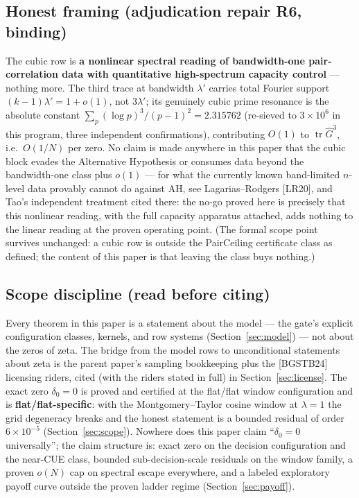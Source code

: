 \documentclass[11pt]{article}
\theoremstyle{plain}
\theoremstyle{definition}
\theoremstyle{remark}
\newcommand{\Gh}{\widehat{G}}
\newcommand{\tr}{\operatorname{tr}}
\begin{document}
\subsection{Honest framing (adjudication repair R6, binding)}

The cubic row is \textbf{a nonlinear spectral reading of bandwidth-one
pair-correlation data with quantitative high-spectrum capacity control} ---
nothing more. The third trace at bandwidth $\lambda'$ carries total Fourier
support $(k - 1)\lambda' = 1 + o(1)$, not $3\lambda'$; its genuinely cubic prime
resonance is the absolute constant
$\sum_p (\log p)^3/(p - 1)^2 = 2.315762$ (re-sieved to $3 \times 10^6$ in this
program, three independent confirmations), contributing $O(1)$ to $\tr \Gh^3$,
i.e.\ $O(1/N)$ per zero. No claim is made anywhere in this paper that the cubic
block evades the Alternative Hypothesis or consumes data beyond the bandwidth-one
class plus $o(1)$ --- for what the currently known band-limited $n$-level data
provably cannot do against AH, see Lagarias--Rodgers [LR20], and Tao's
independent treatment cited there: the no-go proved here is precisely that this
nonlinear reading, with the full capacity apparatus attached, adds nothing to
the linear reading at the proven operating point. (The formal scope point survives
unchanged: a cubic row is outside the PairCeiling certificate class as defined;
the content of this paper is that leaving the class buys nothing.)

\subsection{Scope discipline (read before citing)}

Every theorem in this paper is a statement about the model --- the gate's
explicit configuration classes, kernels, and row systems
(Section~\ref{sec:model}) --- not about the zeros of zeta. The bridge from the
model rows to unconditional statements about zeta is the parent paper's sampling
bookkeeping plus the [BGSTB24] licensing riders, cited (with the riders stated in
full) in Section~\ref{sec:license}. The exact zero $\delta_0 = 0$ is proved and
certified at the flat/flat window configuration and is
\textbf{flat/flat-specific}: with the Montgomery--Taylor cosine window at
$\lambda = 1$ the grid degeneracy breaks and the honest statement is a bounded
residual of order $6 \times 10^{-5}$ (Section~\ref{sec:scope}). Nowhere does this
paper claim ``$\delta_0 = 0$ universally''; the claim structure is: exact zero on
the decision configuration and the near-CUE class, bounded sub-decision-scale
residuals on the window family, a proven $o(N)$ cap on spectral escape
everywhere, and a labeled exploratory payoff curve outside the proven ladder
regime (Section~\ref{sec:payoff}).
\end{document}
